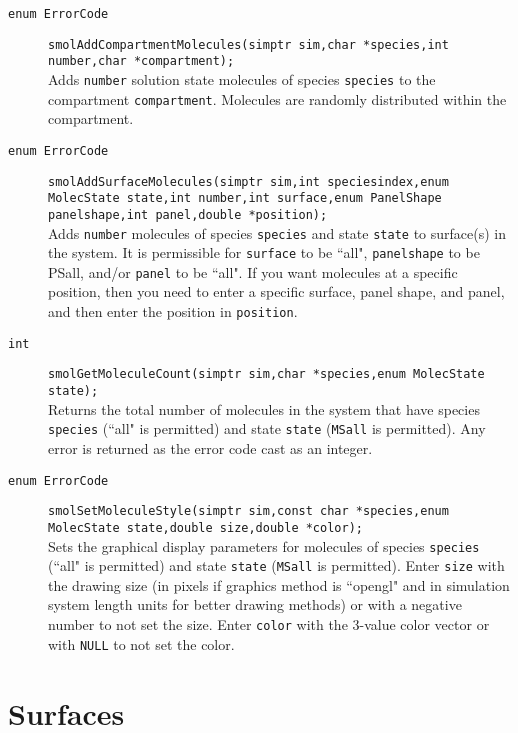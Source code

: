 \documentclass {book}
\begin{document}
\begin{description}
\item[\texttt{enum ErrorCode}]
\texttt{smolAddCompartmentMolecules(simptr sim,char *species,int number,char *compartment);}
\hfill \\
Adds \texttt{number} solution state molecules of species \texttt{species} to the compartment \texttt{compartment}. Molecules are randomly distributed within the compartment.

\item[\texttt{enum ErrorCode}]
\texttt{smolAddSurfaceMolecules(simptr sim,int speciesindex,enum MolecState state,int number,int surface,enum PanelShape panelshape,int panel,double *position);}
\hfill \\
Adds \texttt{number} molecules of species \texttt{species} and state \texttt{state} to surface(s) in the system. It is permissible for \texttt{surface} to be ``all", \texttt{panelshape} to be PSall, and/or \texttt{panel} to be ``all". If you want molecules at a specific position, then you need to enter a specific surface, panel shape, and panel, and then enter the position in \texttt{position}.

\item[\texttt{int}]
\texttt{smolGetMoleculeCount(simptr sim,char *species,enum MolecState state);}
\hfill \\
Returns the total number of molecules in the system that have species \texttt{species} (``all" is permitted) and state \texttt{state} (\texttt{MSall} is permitted). Any error is returned as the error code cast as an integer.

\item[\texttt{enum ErrorCode}]
\texttt{smolSetMoleculeStyle(simptr sim,const char *species,enum MolecState state,double size,double *color);}
\hfill \\
Sets the graphical display parameters for molecules of species \texttt{species} (``all" is permitted) and state \texttt{state} (\texttt{MSall} is permitted). Enter \texttt{size} with the drawing size (in pixels if graphics method is ``opengl" and in simulation system length units for better drawing methods) or with a negative number to not set the size. Enter \texttt{color} with the 3-value color vector or with \texttt{NULL} to not set the color.

\end{description}

\section{Surfaces}
\end{document}
